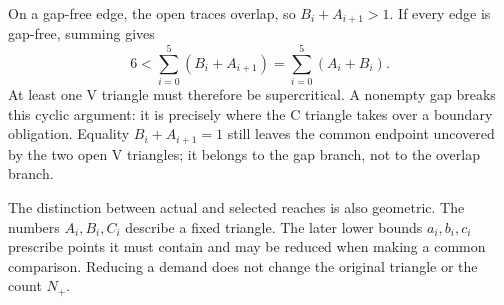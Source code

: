 On a gap-free edge, the open traces overlap, so $B_i+A_{i+1}>1$.
If every edge is gap-free, summing gives
\[
 6<\sum_{i=0}^5(B_i+A_{i+1})=\sum_{i=0}^5(A_i+B_i).
\]
At least one V triangle must therefore be supercritical. A nonempty gap
breaks this cyclic argument: it is precisely where the C triangle takes
over a boundary obligation. Equality $B_i+A_{i+1}=1$ still leaves the
common endpoint uncovered by the two open V triangles; it belongs to the
gap branch, not to the overlap branch.

The distinction between actual and selected reaches is also geometric.
The numbers $A_i,B_i,C_i$ describe a fixed triangle. The later lower bounds
$a_i,b_i,c_i$ prescribe points it must contain and may be reduced when making
a common comparison. Reducing a demand does not change the original
triangle or the count $N_+$.
